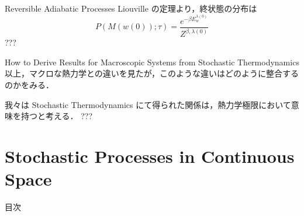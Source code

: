 \documentclass[aspectratio=169, dvipdfmx, 11pt,uplatex]{beamer} %
\begin{document}
\begin{frame}{Reversible Adiabatic Processes}
  Liouville の定理より，終状態の分布は
  \begin{equation}
    P(M(w(0)); \tau ) = \frac{e^{- \beta E_w^{\lambda(0)}}}{Z^{\beta, \lambda(0)}}
  \end{equation}
  ???
\end{frame}

\begin{frame}{How to Derive Results for Macroscopic Systems from Stochastic Thermodynamics}
  以上，マクロな熱力学との違いを見たが，このような違いはどのように整合するのかをみる．\par 
  我々は Stochastic Thermodynamics にて得られた関係は，熱力学極限において意味を持つと考える．
  ???
\end{frame}

\section{Stochastic Processes in Continuous Space}

\begin{frame}{目次}
  \tableofcontents[currentsection]
\end{frame}
\end{document}
